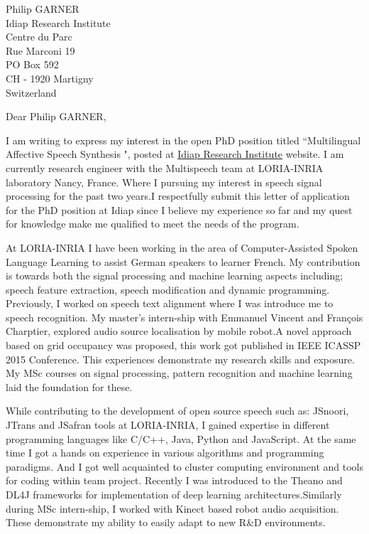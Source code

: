 \documentclass[
	pagenumber=false, %
	parskip=half, %
	fromalign=right, %
	foldmarks=true, %
	addrfield=true %
	]{scrlttr2}
\date{\today} %
\begin{document}
 
\begin{letter}{Philip GARNER \\ Idiap Research Institute\\ Centre du Parc \\ Rue Marconi 19  \\ PO Box 592 \\CH - 1920 Martigny \\Switzerland} %



\opening{Dear Philip GARNER,}

I am writing to express my interest in the open PhD position titled ``Multilingual Affective Speech Synthesis ", posted at \href{https://www.idiap.ch/education-and-jobs}{Idiap Research Institute} website. I am currently research engineer with the Multispeech team at LORIA-INRIA laboratory Nancy, France. Where I pursuing my interest in speech signal processing for the past two years.I respectfully submit this letter of application for the PhD position at 
Idiap since I believe my experience so far and my quest for knowledge make me qualified to meet the needs of the program. 
		
At LORIA-INRIA I have been working in the area of Computer-Assisted Spoken Language Learning to assist German speakers to learner French. My contribution is towards both the signal processing and machine learning aspects including; speech feature extraction, speech modification and dynamic programming. Previously, I worked on speech text alignment where I was  introduce me to speech recognition. My master's intern-ship with Emmanuel Vincent and François Charptier, explored audio source localisation by mobile robot.A novel approach based on grid occupancy was proposed, this work got published in IEEE ICASSP 2015 Conference.  This experiences demonstrate my research skills and exposure. My MSc courses on signal processing, pattern recognition and machine learning laid the foundation for these.   

		
While contributing to the development of open source speech such as: JSnoori, JTrans and JSafran tools at LORIA-INRIA, I gained expertise in different programming languages like C/C++, Java, Python and JavaScript. At the same time I got a hands on experience in various algorithms and programming paradigms. And I got well acquainted 	to cluster computing environment	and tools for coding within team project. Recently I was introduced to the Theano and DL4J frameworks for implementation of deep learning architectures.Similarly during MSc intern-ship, I worked with Kinect based robot audio acquisition. These demonstrate my ability to easily adapt to new
 R\&D environments.    


\end{letter}
\end{document}
